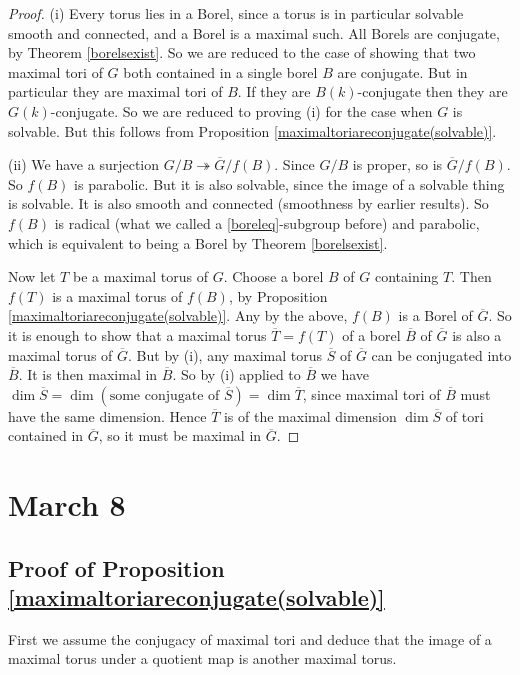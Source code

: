 \documentclass[10pt]{article}
\renewcommand{\(}{\left(}
\renewcommand{\)}{\right)}
\numberwithin{thm}{subsection}
\begin{document}
\begin{proof}
(i) Every torus lies in a Borel, since a torus is in particular solvable smooth and connected, and a Borel is a maximal such.
All Borels are conjugate, by Theorem \ref{borelsexist}. 
So we are reduced to the case of showing that two maximal tori of $G$
both contained in a single borel $B$
are conjugate. But in particular they are maximal tori of $B$.
If they are $B(k)$-conjugate then they are $G(k)$-conjugate.
So we are reduced to proving (i) for the case when $G$ is solvable.
But this follows from Proposition \ref{maximaltoriareconjugate(solvable)}.

(ii) We have a surjection $G/B\twoheadrightarrow\overline{G}/f(B)$.
Since $G/B$ is proper, so is $\overline{G}/f(B)$.
So $f(B)$ is parabolic.
But it is also solvable, since the image of a solvable thing is solvable.
It is also smooth and connected (smoothness by earlier results).
So $f(B)$ is radical (what we called a \eqref{boreleq}-subgroup before)
and parabolic, which is equivalent to being a Borel
by Theorem \ref{borelsexist}.

Now let $T$ be a maximal torus of $G$.
Choose a borel $B$ of $G$
containing $T$.
Then $f(T)$ is a maximal torus of $f(B)$,
by Proposition \ref{maximaltoriareconjugate(solvable)}.
Any by the above, $f(B)$ is a Borel of $\overline{G}$.
So it is enough to show that a maximal torus $\overline{T}=f(T)$ of 
a borel $\overline{B}$ of $\overline{G}$
is also a maximal torus of $\overline{G}$.
But by (i), any maximal torus $\overline{S}$
of $\overline{G}$ can be conjugated into $\overline{B}$.
It is then maximal in $\overline{B}$.
So by (i) applied to $\overline{B}$
we have $\dim \overline{S}=\dim(\text{some conjugate of }\overline{S})
=\dim \overline{T}$, since maximal tori of $\overline{B}$
must have the same dimension.
Hence $\overline{T}$ is of the maximal dimension $\dim \overline{S}$ of tori
contained in $\overline{G}$,
so it must be maximal in $\overline{G}$.
\end{proof} 

\section{March 8}
\subsection{Proof of Proposition \ref{maximaltoriareconjugate(solvable)}}
First we assume the conjugacy of maximal tori and deduce that the image of a maximal torus under a quotient map is another maximal torus.
\end{document}
